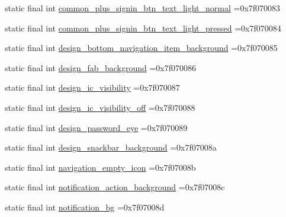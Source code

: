 \begin{DoxyCompactItemize}
\item 
static final int \mbox{\hyperlink{classbr_1_1unb_1_1cic_1_1mp_1_1marketmaster_1_1test_1_1R_1_1drawable_accbc11a259f9747352afbcbb4b5a696b}{common\+\_\+plus\+\_\+signin\+\_\+btn\+\_\+text\+\_\+light\+\_\+normal}} =0x7f070083
\item 
static final int \mbox{\hyperlink{classbr_1_1unb_1_1cic_1_1mp_1_1marketmaster_1_1test_1_1R_1_1drawable_ac58a428e335de48173604f4e1429c840}{common\+\_\+plus\+\_\+signin\+\_\+btn\+\_\+text\+\_\+light\+\_\+pressed}} =0x7f070084
\item 
static final int \mbox{\hyperlink{classbr_1_1unb_1_1cic_1_1mp_1_1marketmaster_1_1test_1_1R_1_1drawable_a6aa41bde51d0dd1e22af4129ab82bd3a}{design\+\_\+bottom\+\_\+navigation\+\_\+item\+\_\+background}} =0x7f070085
\item 
static final int \mbox{\hyperlink{classbr_1_1unb_1_1cic_1_1mp_1_1marketmaster_1_1test_1_1R_1_1drawable_a75c5429bdda03a675c9fd7b27a571810}{design\+\_\+fab\+\_\+background}} =0x7f070086
\item 
static final int \mbox{\hyperlink{classbr_1_1unb_1_1cic_1_1mp_1_1marketmaster_1_1test_1_1R_1_1drawable_a459de7420238f1c443ee8f14d8067771}{design\+\_\+ic\+\_\+visibility}} =0x7f070087
\item 
static final int \mbox{\hyperlink{classbr_1_1unb_1_1cic_1_1mp_1_1marketmaster_1_1test_1_1R_1_1drawable_ad580b360abb2679c1e40d225f1997571}{design\+\_\+ic\+\_\+visibility\+\_\+off}} =0x7f070088
\item 
static final int \mbox{\hyperlink{classbr_1_1unb_1_1cic_1_1mp_1_1marketmaster_1_1test_1_1R_1_1drawable_a8794c2eb0ed0fbb185fa066fdb0d8bc1}{design\+\_\+password\+\_\+eye}} =0x7f070089
\item 
static final int \mbox{\hyperlink{classbr_1_1unb_1_1cic_1_1mp_1_1marketmaster_1_1test_1_1R_1_1drawable_a1d6081752265bcd57bd1558aed11eb93}{design\+\_\+snackbar\+\_\+background}} =0x7f07008a
\item 
static final int \mbox{\hyperlink{classbr_1_1unb_1_1cic_1_1mp_1_1marketmaster_1_1test_1_1R_1_1drawable_abef09d4cc69a820054fa57c8371b0add}{navigation\+\_\+empty\+\_\+icon}} =0x7f07008b
\item 
static final int \mbox{\hyperlink{classbr_1_1unb_1_1cic_1_1mp_1_1marketmaster_1_1test_1_1R_1_1drawable_a1ba9b6c7b415946b025fc4125490f03c}{notification\+\_\+action\+\_\+background}} =0x7f07008c
\item 
static final int \mbox{\hyperlink{classbr_1_1unb_1_1cic_1_1mp_1_1marketmaster_1_1test_1_1R_1_1drawable_a6e8254786d4159ba571e6ddabe894a9d}{notification\+\_\+bg}} =0x7f07008d

\end{DoxyCompactItemize}
